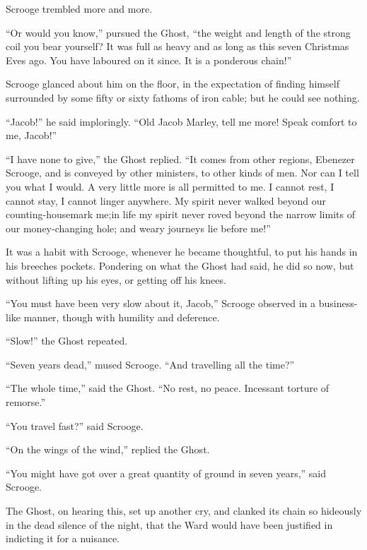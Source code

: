 \documentclass[paper=5.5in:8.5in,BCOR=5mm,twoside,DIV=calc,12pt,usegeometry]{scrbook} %
\begin{document}
Scrooge trembled more and more.

\enquote{Or would you know,} pursued the Ghost, \enquote{the weight and length of the strong coil you bear yourself? It was full as heavy and as long as this seven Christmas Eves ago. You have laboured on it since. It is a ponderous chain!}

Scrooge glanced about him on the floor, in the expectation of finding himself surrounded by some fifty or sixty fathoms of iron cable; but he could see nothing.




\enquote{Jacob!} he said imploringly. \enquote{Old Jacob Marley, tell me more! Speak comfort to me, Jacob!}



\enquote{I have none to give,} the Ghost replied. \enquote{It comes from other regions, Ebenezer Scrooge, and is conveyed by other ministers, to other kinds of men. Nor can I tell you what I would. A very little more is all permitted to me. I cannot rest, I cannot stay, I cannot linger anywhere. My spirit never walked beyond our counting-house\textemdash mark me;\textemdash in life my spirit never roved beyond the narrow limits of our money-changing hole; and weary journeys lie before me!}



It was a habit with Scrooge, whenever he became thoughtful, to put his hands in his breeches pockets. Pondering on what the Ghost had said, he did so now, but without lifting up his eyes, or getting off his knees.

\enquote{You must have been very slow about it, Jacob,} Scrooge observed in a business-like manner, though with humility and deference.



\enquote{Slow!} the Ghost repeated.

\enquote{Seven years dead,} mused Scrooge. \enquote{And travelling all the time?}



\enquote{The whole time,} said the Ghost. \enquote{No rest, no peace. Incessant torture of remorse.}

\enquote{You travel fast?} said Scrooge.

\enquote{On the wings of the wind,} replied the Ghost. 

\enquote{You might have got over a great quantity of ground in seven years,} said Scrooge.



The Ghost, on hearing this, set up another cry, and clanked its chain so hideously in the dead silence of the night, that the Ward would have been justified in indicting it for a nuisance.
\end{document}
